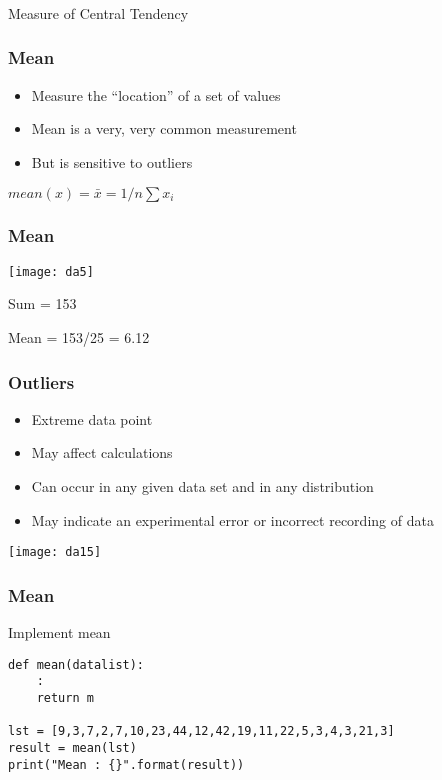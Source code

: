\begin{frame}[fragile]\frametitle{}
\begin{center}
{\Large Measure of Central Tendency}
\end{center}
\end{frame}

\begin{frame}[fragile]\frametitle{Mean}	
\begin{itemize}
\item Measure the ``location'' of a set of values
\item Mean is a very, very common measurement
\item But is sensitive to outliers
\end{itemize}
$mean(x) = \bar{x} = 1/n \sum x_i$
\end{frame}

\begin{frame}[fragile]\frametitle{Mean}	
\begin{center}
\texttt{[image: da5]}
\end{center}
Sum = 153

Mean = 153/25 = 6.12
\end{frame}

\begin{frame}[fragile]\frametitle{Outliers}	
\begin{itemize}
\item Extreme data point
\item May affect calculations
\item  Can occur in any given data set and in any distribution
\item  May indicate an experimental error or incorrect recording of data
\end{itemize}
\begin{center}
\texttt{[image: da15]}
\end{center}
\end{frame}


\begin{frame}[fragile]\frametitle{Mean}
Implement mean
\begin{lstlisting}
def mean(datalist):
	:
	return m

lst = [9,3,7,2,7,10,23,44,12,42,19,11,22,5,3,4,3,21,3]
result = mean(lst)
print("Mean : {}".format(result))
\end{lstlisting}
\end{frame}

